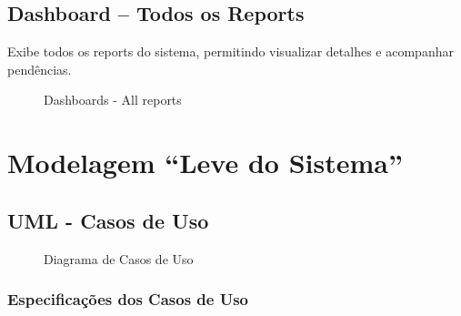 \documentclass[12pt,a4paper]{article}
\begin{document}
\subsection{Dashboard – Todos os Reports}
Exibe todos os reports do sistema, permitindo visualizar detalhes e acompanhar pendências.

\begin{figure}[H]
\centering
{}
 
\caption{Dashboards - All reports}
\end{figure}

\section{Modelagem ``Leve do Sistema''}
\label{sec:modelagem}

\subsection{UML - Casos de Uso}

\begin{figure}[H]
\centering

\caption{Diagrama de Casos de Uso}
\end{figure}

\subsubsection{Especificações dos Casos de Uso}
\end{document}
